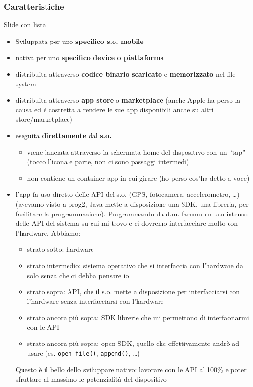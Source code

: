 \subsubsection{Caratteristiche}
Slide con lista
\begin{itemize}
    \item Sviluppata per uno \textbf{specifico s.o. mobile}
    \item nativa per uno \textbf{specifico device o piattaforma}
    \item distribuita attraverso \textbf{codice binario} \textbf{scaricato} e \textbf{memorizzato} nel file system
    \item distribuita attraverso \textbf{app store} o \textbf{marketplace} (anche Apple ha perso la causa ed è costretta a rendere le sue app disponibili anche su altri store/marketplace)
    \item eseguita \textbf{direttamente} dal \textbf{s.o.}
    \begin{itemize}
        \item viene lanciata attraverso la schermata home del dispositivo con un ``tap'' (tocco l'icona e parte, non ci sono passaggi intermedi)
        \item non contiene un container app in cui girare (ho perso cos'ha detto a voce)
    \end{itemize}
    \item l'app fa uso diretto delle API del s.o. (GPS, fotocamera, accelerometro, \dots) (avevamo visto a prog2, Java mette a disposizione una SDK, una libreria, per facilitare la programmazione). Programmando da d.m. faremo un uso intenso delle API del sistema su cui mi trovo e ci dovremo interfacciare molto con l'hardware. Abbiamo:
    \begin{itemize}
        \item strato sotto: hardware
        \item strato intermedio: sistema operativo che si interfaccia con l'hardware da solo senza che ci debba pensare io
        \item strato sopra: API, che il s.o. mette a disposizione per interfacciarsi con l'hardware senza interfacciarsi con l'hardware
        \item strato ancora più sopra: SDK librerie che mi permettono di interfacciarmi con le API
        \item strato ancora più sopra: open SDK, quello che effettivamente andrò ad usare (es. \texttt{open file()}, \texttt{append()}, \dots)
    \end{itemize}
    Questo è il bello dello sviluppare nativo: lavorare con le API al 100\% e poter sfruttare al massimo le potenzialità del dispositivo
\end{itemize}


